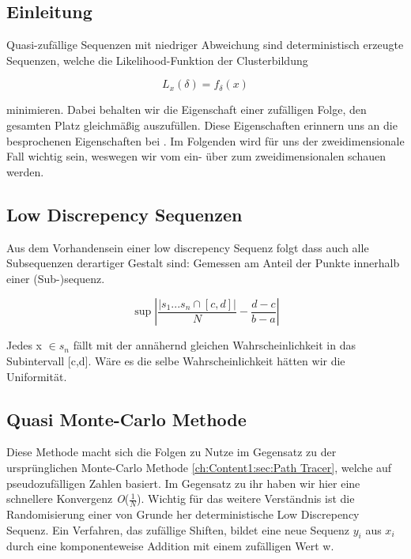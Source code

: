 \cite{owen1998scrambling} \cite{heitz:hal02150657}


\subsection{Einleitung}
Quasi-zufällige Sequenzen mit niedriger Abweichung sind deterministisch 
erzeugte Sequenzen, welche die Likelihood-Funktion der Clusterbildung

\begin{equation}\label{eq:Likeli-Hood-Gleichung}
    L_{x}(\delta) = f_{\delta}(x)
\end{equation}

minimieren. Dabei behalten wir die Eigenschaft einer zufälligen Folge, 
den gesamten Platz gleichmäßig auszufüllen. Diese Eigenschaften erinnern
uns an die besprochenen Eigenschaften bei .
Im Folgenden wird für uns der zweidimensionale Fall wichtig sein, weswegen
wir vom ein- über zum zweidimensionalen schauen werden.

\subsection{Low Discrepency Sequenzen}
Aus dem Vorhandensein einer low discrepency Sequenz folgt dass auch alle 
Subsequenzen derartiger Gestalt sind: Gemessen am Anteil der Punkte innerhalb
einer (Sub-)sequenz.

\begin{equation}\label{eq:Low Discrepency}
    \sup{\left| \frac{\left| s_{1}...s_{n} \cap [c,d]\right|}{N} - \frac{d-c}{b-a} \right|}
\end{equation}

Jedes x $\in s_{n}$ fällt mit der annähernd gleichen Wahrscheinlichkeit
in das Subintervall [c,d]. Wäre es die selbe Wahrscheinlichkeit hätten 
wir die Uniformität.

\label{sec:quasi monte carlo}
\subsection{Quasi Monte-Carlo Methode}
Diese Methode macht sich die  Folgen zu Nutze
im Gegensatz zu der ursprünglichen Monte-Carlo Methode \ref{ch:Content1:sec:Path Tracer},
welche auf pseudozufälligen Zahlen basiert. Im Gegensatz zu ihr haben wir 
hier eine schnellere Konvergenz \textit{O}($\frac{1}{N}$).
Wichtig für das weitere Verständnis ist die Randomisierung einer von Grunde
her deterministische Low Discrepency Sequenz. Ein Verfahren, das 
zufällige Shiften, bildet eine neue Sequenz $y_{i}$ aus $x_{i}$ durch 
eine komponenteweise Addition mit einem zufälligen Wert w.

